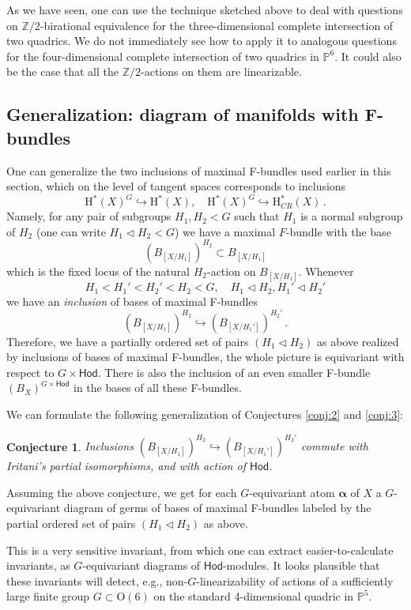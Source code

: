 \documentclass[12pt,a4paper]{amsart}
\newtheorem{conjecture}[theorem]{Conjecture}
\theoremstyle{definition}
\theoremstyle{remark}
\newcommand{\rH}{\mathrm{H}}
\begin{document}
As we have seen, one can use the technique sketched above to deal with questions on $\mathbb Z/2$-birational equivalence for the three-dimensional complete intersection of two quadrics. We do not immediately see how to apply it to analogous questions for the four-dimensional complete intersection of two quadrics in $\mathbb P^6$. It could also be the case that all the $\mathbb Z/2$-actions on them are linearizable.


\subsection{Generalization: diagram of manifolds with F-bundles} 

One can generalize the two inclusions of maximal F-bundles used earlier in this section, which on the level of tangent spaces corresponds to inclusions
$$\rH^*(X)^G\hookrightarrow \rH^*(X),\quad \rH^*(X)^G\hookrightarrow \rH^*_{CR}(X)\,.$$
Namely, for any pair of subgroups $H_1,H_2<G$ such that $H_1$ is a normal subgroup of $H_2$  (one can write $H_1\triangleleft H_2<G$) we have a maximal $F$-bundle with the base
  $$(B_{[X/H_1]})^{H_2}\subset B_{[X/H_1]}$$
  which is the fixed locus of the natural $H_2$-action on $B_{[X/H_1]}$. Whenever
  $$H_1<H_1'<H_2'<H_2<G,\quad H_1\triangleleft H_2,H_1'\triangleleft H_2'$$
  we have an \textit{inclusion} of bases of maximal F-bundles
  $$(B_{[X/H_1]})^{H_2}\hookrightarrow (B_{[X/H_1']})^{H_2'}\,.$$
  Therefore, we have a partially ordered set of pairs $(H_1\triangleleft H_2)$ as above realized by inclusions of bases of maximal F-bundles, the whole picture is equivariant with respect to $G\times\mathsf{Hod}$. There is also the inclusion of an even smaller F-bundle $(B_X)^{G\times \mathsf{Hod}}$
  in the bases of all these F-bundles.


We can formulate the following generalization of Conjectures \ref{conj:2} and \ref{conj:3}:
  \begin{conjecture}
      Inclusions $(B_{[X/H_1]})^{H_2}\hookrightarrow (B_{[X/H_1']})^{H_2'}$ commute with Iritani's partial isomorphisms, and with action of $\mathsf{Hod}$.
  \end{conjecture}

  Assuming the above conjecture, we get for each $G$-equivariant atom $\boldsymbol\alpha$ of $X$ a $G$-equivariant diagram of germs of bases of maximal F-bundles labeled by the partial ordered set of pairs  $(H_1\triangleleft H_2)$ as above.

This is a very sensitive invariant, from which one can extract easier-to-calculate invariants, as $ G$-equivariant diagrams of $\mathsf{Hod}$-modules. It looks plausible that these invariants will detect, e.g., non-$G$-linearizability of actions of a sufficiently large finite group $G\subset \mathrm O(6)$ on the standard 4-dimensional quadric in $\mathbb P^5$.
\end{document}
